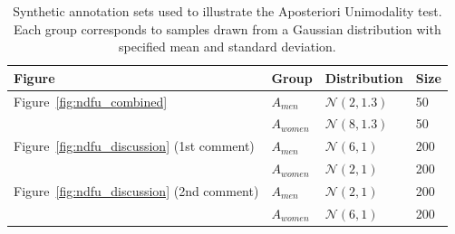 \documentclass[twocolumn, 8pt]{article}
\begin{document}
\begin{table}[ht]
\centering
\begin{tabular}{|l|l|l|l|}
\hline
\textbf{Figure} & \textbf{Group} & \textbf{Distribution} & \textbf{Size} \\
\hline
Figure~\ref{fig:ndfu_combined}
  & $A_{men}$   & $\mathcal{N}(2, 1.3)$  & 50 \\
  & $A_{women}$ & $\mathcal{N}(8, 1.3)$  & 50 \\
\hline
Figure~\ref{fig:ndfu_discussion} (1st comment)
  & $A_{men}$   & $\mathcal{N}(6, 1)$  & 200 \\
  & $A_{women}$ & $\mathcal{N}(2, 1)$  & 200 \\
\hline
Figure~\ref{fig:ndfu_discussion} (2nd comment) 
  & $A_{men}$   & $\mathcal{N}(2, 1)$  & 200 \\
  & $A_{women}$ & $\mathcal{N}(6, 1)$  & 200 \\
\hline
\end{tabular}
\caption{Synthetic annotation sets used to illustrate the Aposteriori Unimodality test. Each group corresponds to samples drawn from a Gaussian distribution with specified mean and standard deviation.}
\label{tab:synthetic_annotation_sets}
\end{table}
\end{document}

